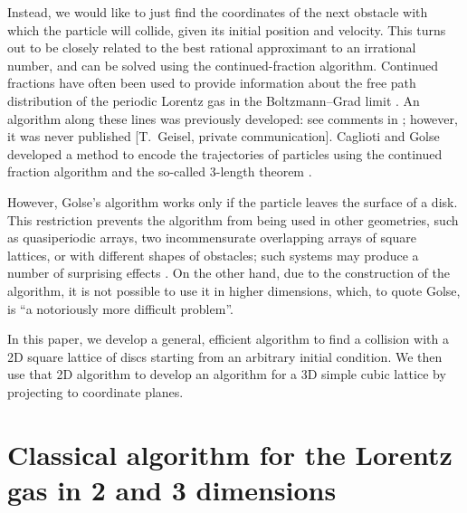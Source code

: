 \documentclass{iopart}
\begin{document}
Instead, we would like to just find the coordinates of the next obstacle with which the particle will collide, given its initial position and velocity.
%
%
This turns out to be  closely related to the best rational approximant to an irrational number, and  can be solved using the continued-fraction algorithm. 
 Continued fractions have often been used to provide information about the free path distribution of the periodic Lorentz gas in the Boltzmann--Grad limit \cite{caglioti2003distribution, golse2012recent,boca2007distribution,golse2006periodic,caglioti2008boltzmann, caglioti2010boltzmann, golse2000distribution, bleher1992statistical,chernov1994statistical}.
  An algorithm along these lines was previously developed: see comments in \cite{zacherl1986power}; however, it was never published %
[T.~Geisel, private communication].
 Caglioti and Golse developed a method to encode the trajectories of particles using the continued fraction algorithm and the so-called 3-length theorem \cite{caglioti2003distribution, golse2012recent}. 


However, Golse's algorithm works only if the particle leaves the surface of a disk. This restriction prevents the algorithm from being used in other geometries, such as quasiperiodic arrays, two incommensurate overlapping arrays of square lattices, or with different shapes of obstacles; such systems may produce a number of surprising effects \cite{marklof2014power}.  On the other hand, due to the construction of the algorithm, it is not possible to use it in higher dimensions, which, to quote Golse, is ``a notoriously more difficult problem''.

In this paper, we develop a general, efficient algorithm to find a collision with a 2D square lattice of discs starting from an arbitrary initial condition. We then use that 2D algorithm to develop an algorithm for a 3D simple cubic lattice by projecting to coordinate planes.

\section{Classical algorithm for the Lorentz gas in 2 and 3 dimensions}
\end{document}
